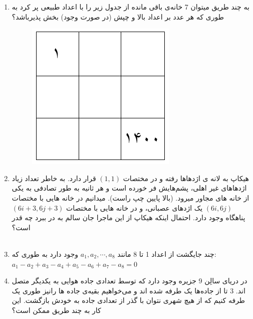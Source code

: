 \documentclass{article}
\begin{document}
	\begin{enumerate}
    \item    
  به چند طریق میتوان 7 خانه‌ی باقی مانده از جدول زیر را با اعداد طبیعی پر کرد به طوری که هر عدد بر اعداد بالا و چپش (در صورت وجود) بخش پذیرباشد؟\\
   \begin{figure}[H]
   	\centering
   	\includegraphics[scale=0.4]{P1.png}
   \end{figure}
		\item  
هیکاپ به لانه ی اژدهاها رفته و در مختصات $(1,1)$ قرار دارد. به خاطر تعداد زیاد اژدهاهای غیر اهلی، پشم‌هایش فر خورده است و هر ثانیه به طور تصادفی به یکی از خانه های مجاور میرود. (بالا پایین چپ راست). میدانیم در خانه هایی با مختصات $(6i, 6j)$ یک اژدهای عصبانی، و در خانه هایی با مختصات $(6i+3, 6j+3)$ پناهگاه وجود دارد. احتمال اینکه هیکاپ از این ماجرا جان سالم به در ببرد چه قدر است؟
\\
\\
    \item
چند جایگشت از اعداد 1 تا 8 مانند $a_1, a_2, \cdots , a_8$ وجود دارد به طوری که: 
$ a_1 - a_2 + a_3 - a_4 + a_5 - a_6 + a_7 - a_8 = 0 $
 \\
		\item
		در دریای سالِن 9 جزیره وجود دارد که توسط تعدادی جاده هوایی به یکدیگر متصل اند. 3 تا از جاده‌ها یک طرفه شده اند و می‌خواهیم بقیه‌ی جاده ها رانیز طوری یک طرفه کنیم که از هیچ شهری نتوان با گذر از تعدادی جاده به خودش بازگشت. این کار به چند طریق ممکن است؟\\
		\begin{figure}[H]
			\centering

\end{figure}
\end{enumerate}
\end{document}
